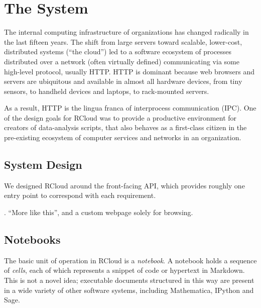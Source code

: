 \section{The System\label{sec:system}}


The internal computing infrastructure of organizations has changed
radically in the last fifteen years. The shift from large
servers toward scalable, lower-cost, distributed systems (``the cloud'')
led to a software ecosystem of processes distributed over a
network (often virtually defined) communicating via some
high-level protocol, usually HTTP. HTTP is dominant because web
browsers and servers are ubiquitous and available in almost
all hardware devices, from tiny sensors, to handheld devices and
laptops, to rack-mounted servers.

As a result, HTTP is the lingua franca of interprocess communication
(IPC). One of the design goals for RCloud was to provide a productive
environment for creators of data-analysis scripts, that also behaves
as a first-class citizen in the pre-existing ecosystem of computer
services and networks in an organization.


\subsection{System Design}

We designed RCloud around the front-facing API, which provides roughly
one entry point to correspond with each requirement.




. ``More like this'', and a custom webpage solely for browsing.

\subsection{Notebooks\label{sec:notebooks}}

The basic unit of operation in RCloud is a \emph{notebook}. A notebook
holds a sequence of \emph{cells}, each of which represents a
snippet of code or hypertext in Markdown. This is not a novel idea;
executable documents structured in this way are present in a wide
variety of other software systems, including Mathematica, IPython and Sage.

